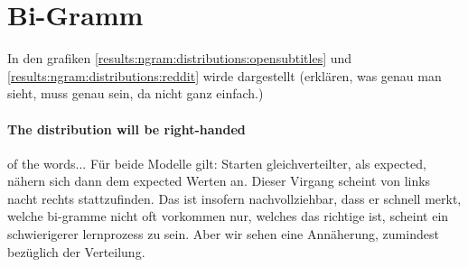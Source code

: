 \section{Bi-Gramm}
In den grafiken \ref{results:ngram:distributions:opensubtitles} und \ref{results:ngram:distributions:reddit} wirde dargestellt (erklären, was genau man sieht, muss genau sein, da nicht ganz einfach.)

\paragraph{The distribution will be right-handed} of the words... Für beide Modelle gilt: Starten gleichverteilter, als expected, nähern sich dann dem expected Werten an. Dieser Virgang scheint von links nacht rechts stattzufinden. Das ist insofern nachvollziehbar, dass er schnell merkt, welche bi-gramme nicht oft vorkommen nur, welches das richtige ist, scheint ein schwierigerer lernprozess zu sein. Aber wir sehen eine Annäherung, zumindest bezüglich der Verteilung.
